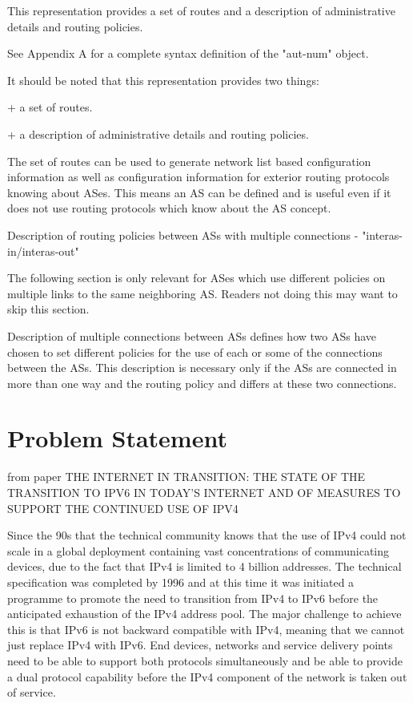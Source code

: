 \documentclass[11pt]{report}
\begin{document}
This representation provides a set of routes and a description of administrative details and routing policies. 
        
        
          
          
          
          


	See Appendix A for a complete syntax definition of the "aut-num"
   object.


   It should be noted that this representation provides two things:

       + a set of routes.

       + a description of administrative details and routing policies.

   The set of routes can be used to generate network list based
   configuration information as well as configuration information for
   exterior routing protocols knowing about ASes. This means an AS can
   be defined and is useful even if it does not use routing protocols
   which know about the AS concept.

   Description of routing policies between ASs with multiple connections
   - "interas-in/interas-out"

   The following section is only relevant for ASes which use different
   policies on multiple links to the same neighboring AS. Readers not
   doing this may want to skip this section.

   Description of multiple connections between ASs defines how two ASs
   have chosen to set different policies for the use of each or some of
   the connections between the ASs.  This description is necessary only
   if the ASs are connected in more than one way and the routing policy
   and differs at these two connections.

\section{Problem Statement}

from paper THE INTERNET IN TRANSITION: THE STATE OF THE TRANSITION TO IPV6 IN
TODAY'S INTERNET AND OF MEASURES TO SUPPORT THE CONTINUED USE OF
IPV4

Since the 90s that the technical community knows that the use of IPv4 could not scale in a global deployment containing vast concentrations of communicating devices, due to the fact that IPv4 is limited to 4 billion addresses. The technical specification was completed by 1996 and at this time it was initiated a programme to promote the need to transition from IPv4 to IPv6 before the anticipated exhaustion of the IPv4 address pool. The major challenge to achieve this is that IPv6 is not backward compatible with IPv4, meaning that we cannot just replace IPv4 with IPv6. End devices, networks and service delivery points need to be able to support both protocols simultaneously and be able to provide a dual protocol capability before the IPv4 component of the network is taken out of service.     
\end{document}
